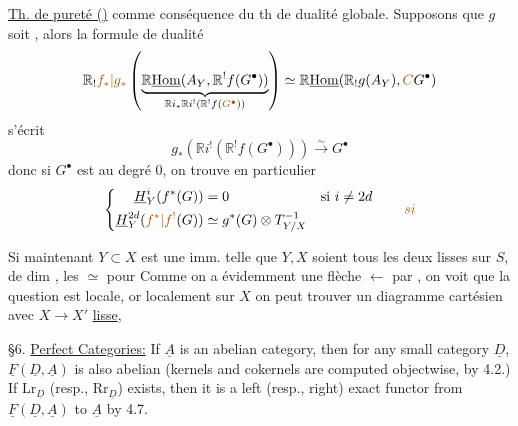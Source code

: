 \uline{Th. de pureté ()} comme conséquence du
th de dualité globale. Supposons que
$g$ soit 
,
alors la formule de dualité 
\[
\mathbb{R}_!\unsure{f_*|g_*}
\left(\underbrace{\mathbb{R}\underline{\operatorname{Hom}}(A_Y,\mathbb{R}^!f(G^\bullet))}
_{\mathbb{R}i_*\mathbb{R}i^!(\mathbb{R}^!f(\unsure{G^\bullet}))}\right)
\simeq \mathbb{R}\underline{\operatorname{Hom}}(\mathbb{R}_!g(A_Y),\deleted{\unsure{C}}G^\bullet)
\]
s'écrit
\[
g_*(\mathbb{R}i^!(\mathbb{R}^!f(G^\bullet)))\xrightarrow{\sim}G^\bullet
\]
donc si $G^\bullet$ est  au degré $0$, on
trouve en particulier
\[
\left\{
\begin{aligned}
\underline{H}^i_Y(f^*(G))&=0 &&\text{si }i\ne 2d\\
\underline{H}^{2d}_Y(\unsure{f^*|f^!}(G))&\simeq g^*(G)\otimes T_{Y/X}^{-1}
\end{aligned}
\right.
\qquad\deleted{\unsure{si}}
\]

Si maintenant $Y\subset X$ est  une imm.
telle que $Y,X$ soient tous les deux lisses
sur $S$, de dim ,
 
 les $\simeq$  pour  
Comme on a évidemment une flèche 
$\longleftarrow$ par , on voit que la question est
locale, or localement sur $X$ on peut trouver
un diagramme cartésien
avec $X\longrightarrow X'$ \uline{lisse},


\S 6. \uline{Perfect Categories:} If $\underline{A}$ is an abelian category, then
for any small category $\underline{D}$, $\underline{F}(\underline{D},\underline{A})$ is also abelian (kernels
and cokernels are computed objectwise, by 4.2.) If $\mathrm{Lr}_{\underline{D}}$
(resp., $\mathrm{Rr}_{\underline{D}}$) exists, then it is a left (resp., right) exact
functor from $\underline{F}(\underline{D},\underline{A})$ to $\underline{A}$ by 4.7.

